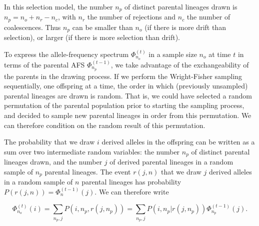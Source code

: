 \documentclass[review]{elsarticle}
\newcommand{\afs}[2]{\Phi_{#1}^{(#2)}}
\begin{document}

In this selection model, the number $n_p$ of distinct parental lineages drawn is $n_p = n_o+n_r-n_c$, with $n_r$ 
the number of rejections and $n_c$ the number of coalescences. 
Thus $n_p$ can be smaller than $n_o$ (if there is more drift than selection), or larger 
(if there is more selection than drift). 




To express the allele-frequency spectrum $\afs{n_o}{t}$ in a sample size $n_o$ at time $t$ in terms of the parental AFS $\afs{n_p}{t-1}$, we take advantage of the exchangeability of the parents in the drawing process. If we perform the Wright-Fisher sampling sequentially, one offspring at a time, the order in which (previously unsampled) parental lineages are drawn is random. 
That is, we could have selected a random permutation of the parental population prior to starting the sampling process,
and decided to sample new parental lineages in order from this permutation. 
We can therefore condition on the random result of this permutation. 

The probability that we draw $i$ derived alleles in the offspring can be written as a sum over two intermediate random variables: 
the number $n_p$ of  distinct parental lineages drawn, and the number $j$ of derived parental lineages in a random sample of $n_p$ 
parental lineages. The event $r(j,n)$ that we draw $j$ derived alleles in a random sample of $n$ parental 
lineages has probability $P(r(j,n)) =\afs{n}{t-1}(j).$ We can therefore write


$$\afs{n_o}{t}(i) = \sum_{n_p,j} P(i,n_p,r(j,n_p)) =\sum_{n_p,j}  P(i,n_p | r(j,n_p)) \afs{n_p}{t-1}(j).$$
 
\end{document}
